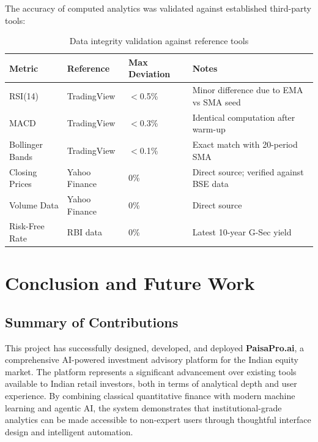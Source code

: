 \documentclass[12pt, a4paper, oneside]{report}
\newcommand{\projectname}{PaisaPro.ai}
\begin{document}
The accuracy of computed analytics was validated against established third-party tools:

\begin{table}[H]
\centering
\caption{Data integrity validation against reference tools}
\label{tab:data_validation}
\begin{tabularx}{\textwidth}{@{}l l l X@{}}
\toprule
\textbf{Metric} & \textbf{Reference} & \textbf{Max Deviation} & \textbf{Notes} \\
\midrule
RSI(14) & TradingView & $<$0.5\% & Minor difference due to EMA vs SMA seed \\
MACD & TradingView & $<$0.3\% & Identical computation after warm-up \\
Bollinger Bands & TradingView & $<$0.1\% & Exact match with 20-period SMA \\
Closing Prices & Yahoo Finance & 0\% & Direct source; verified against BSE data \\
Volume Data & Yahoo Finance & 0\% & Direct source \\
Risk-Free Rate & RBI data & 0\% & Latest 10-year G-Sec yield \\
\bottomrule
\end{tabularx}
\end{table}


\chapter{Conclusion and Future Work}
\label{chap:conclusion}

\section{Summary of Contributions}
\label{sec:contributions}

This project has successfully designed, developed, and deployed \textbf{\projectname{}}, a comprehensive AI-powered investment advisory platform for the Indian equity market. The platform represents a significant advancement over existing tools available to Indian retail investors, both in terms of analytical depth and user experience. By combining classical quantitative finance with modern machine learning and agentic AI, the system demonstrates that institutional-grade analytics can be made accessible to non-expert users through thoughtful interface design and intelligent automation.
\end{document}
